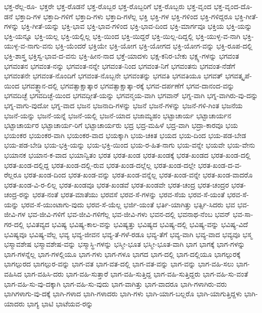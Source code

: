 {ಭಕ್ತ-ರೆಲ್ಲ-ರೂ-
ಭಕ್ತರೇ
ಭಕ್ತ-ರೊಡನೆ
ಭಕ್ತ-ರೊಬ್ಬರ
ಭಕ್ತ-ರೊಬ್ಬರಿಗೆ
ಭಕ್ತ-ರೊಬ್ಬರು
ಭಕ್ತ-ವೃಂದ
ಭಕ್ತ-ವೃಂದ-ದೊ-ಡನೆ
ಭಕ್ತಾದಿ-ಗಳ
ಭಕ್ತಾದಿ-ಗಳಿಗೆ
ಭಕ್ತಾದಿ-ಗಳು
ಭಕ್ತಾದಿ-ಗಳೆಲ್ಲ
ಭಕ್ತಿ
ಭಕ್ತಿ-ಗಳ
ಭಕ್ತಿ-ಗಳಿಂದ
ಭಕ್ತಿ-ಗಳಿದ್ದರೂ
ಭಕ್ತಿ-ಗೀತೆ-ಗಳನ್ನು
ಭಕ್ತಿ-ಗೀತೆ-ಯನ್ನು
ಭಕ್ತಿ-ಭಾವ
ಭಕ್ತಿ-ಭಾವ-ಗಳಿಂದ
ಭಕ್ತಿ-ಭಾವ-ದಿಂದ
ಭಕ್ತಿ-ಮಾರ್ಗವೂ
ಭಕ್ತಿಯ
ಭಕ್ತಿ-ಯನ್ನು
ಭಕ್ತಿ-ಯನ್ನೂ
ಭಕ್ತಿ-ಯಲ್ಲ
ಭಕ್ತಿ-ಯಲ್ಲಿಲ್ಲ
ಭಕ್ತಿ-ಯಿಂದ
ಭಕ್ತಿ-ಯಿದ್ದರೆ
ಭಕ್ತಿ-ಯಿಲ್ಲ-ದಿದ್ದಲ್ಲಿ
ಭಕ್ತಿ-ಯುಳ್ಳ-ವ-ನಾಗಿ
ಭಕ್ತಿ-ಯುಳ್ಳ-ವ-ನಾಗು-ವನು
ಭಕ್ತಿ-ಯೆಂದರೆ
ಭಕ್ತಿಯೇ
ಭಕ್ತಿ-ಯೋಗ
ಭಕ್ತಿ-ಯೋಗದ
ಭಕ್ತಿ-ಯೋಗ-ವನ್ನು
ಭಕ್ತಿ-ರೂಪ-ದಲ್ಲಿ
ಭಕ್ತಿ-ಶಾಸ್ತ್ರ
ಭಕ್ತಿಸ್ವ-ಭಾವ-ದ-ವನು
ಭಕ್ತಿ-ಹೀನ-ನಾದ
ಭಕ್ತೆ-ಯಾದಳು
ಭಕ್ಷ-ಕನಿರ-ಬೇಕು
ಭಕ್ಷ್ಯ-ಗಳನ್ನು
ಭಗವಂತ
ಭಗವಂತನ
ಭಗವಂತ-ನನ್ನು
ಭಗವಂತ-ನನ್ನೇ
ಭಗವಂತ-ನಿಂದ
ಭಗವಂತ-ನಿಗೆ
ಭಗವಂತನು
ಭಗವಂತ-ನೆಡೆಗೆ
ಭಗವಂತನೇ
ಭಗವಂತ-ನೊಂದಿಗೆ
ಭಗವಂತ-ನೊಬ್ಬನೇ
ಭಗವಂತನ್ನು
ಭಗವತಿ
ಭಗವತಿಯೂ
ಭಗವತ್
ಭಗವತ್ಕೃಪೆ-ಯಿಂದ
ಭಗವತ್ಧ್ಯಾನ-ದಲ್ಲಿ
ಭಗವತ್ಸಾಕ್ಷಾತ್ಕಾರ
ಭಗವತ್ಸಾಕ್ಷಾತ್ಕಾ-ರಕ್ಕೆ
ಭಗವ-ದರ್ಪಣೆಗೆ
ಭಗವ-ದಾನಂದ-ವನ್ನು
ಭಗವದಿಚ್ಛೆ
ಭಗವದಿಚ್ಛೆ-ಯಿಂದ
ಭಗವದ್ಗೀತೆ-ಯನ್ನು
ಭಗವನ್ಮಯ-ವಾಗಿ
ಭಗವಾನ್
ಭಗ್ನ-ವಾಗಿ
ಭಗ್ನ-ವಾಗಿರು-ವು-ದನ್ನು
ಭಗ್ನ-ವಾಗು-ವುದೋ
ಭಗ್ನ-ವಾದ
ಭಜನ
ಭಜನಾದಿ-ಗಳನ್ನು
ಭಜನೆ
ಭಜನೆ-ಗಳನ್ನು
ಭಜನೆ-ಗಳಿ-ಗಿಂತ
ಭಜನೆಯ
ಭಜನೆ-ಯನ್ನು
ಭಜನೆ-ಯನ್ನೆ
ಭಜನೆ-ಯಲ್ಲಿ
ಭಜನೆ-ಯಾದ
ಭಜಾಮ್ಯಹಂ
ಭಟ್ಟಾಚಾರ್ಯ
ಭಟ್ಟಾಚಾರ್ಯನ
ಭಟ್ಟಾಚಾರ್ಯರ
ಭಟ್ಟಾಚಾರ್ಯ-ರಿಗೆ
ಭಟ್ಟಾಚಾರ್ಯರು
ಭದ್ರ
ಭದ್ರ-ಮಹಿಳೆ
ಭದ್ರ-ವಾಗಿ
ಭದ್ರಾ-ಕಾರವೂ
ಭಯ
ಭಯಂಕರ
ಭಯಂಕರ-ವಾಗಿ
ಭಯಂಕರ-ವಾದ
ಭಯಕ್ಕಾಗಿ
ಭಯ-ಚಕಿತ
ಭಯದ
ಭಯ-ದಿಂದ
ಭಯ-ಪಡ-ಬೇಡ
ಭಯ-ಪಡ-ಬೇಡಿ
ಭಯ-ಭಕ್ತಿ-ಯನ್ನು
ಭಯ-ಭಕ್ತಿ-ಯಿಂದ
ಭಯ-ರ-ಹಿತ-ನಾಗು
ಭಯ-ವನ್ನೇ
ಭಯವೇ
ಭಯ-ವೇನು
ಭಯಾನಕ
ಭಯಾನ-ಕ-ವಾದ
ಭಯಾನ್ವಿತಂ
ಭರತ
ಭರತ-ಖಂಡ
ಭರತ-ಖಂಡಕ್ಕೆ
ಭರತ-ಖಂಡದ
ಭರತ-ಖಂಡ-ದಲ್ಲಿ
ಭರತ-ಖಂಡ-ದಲ್ಲಿದ್ದ
ಭರತ-ಖಂಡ-ದಲ್ಲಿ-ರುವ
ಭರತ-ಖಂಡ-ದಲ್ಲೆಲ್ಲ
ಭರತ-ಖಂಡ-ದಲ್ಲೇ
ಭರತ-ಖಂಡ-ದ-ವ-ರೆಲ್ಲರೂ
ಭರತ-ಖಂಡ-ದಿಂದ
ಭರತ-ಖಂಡ-ವನ್ನು
ಭರತ-ಖಂಡ-ವನ್ನೆಲ್ಲ
ಭರತ-ಖಂಡ-ವನ್ನೇ
ಭರತ-ಖಂಡ-ವಾದರೊ
ಭರತ-ಖಂಡ-ವಿ-ರ-ಲಿಲ್ಲ
ಭರತ-ಖಂಡವೂ
ಭರತ-ಖಂಡವೆ
ಭರತ-ಖಂಡವೇ
ಭರತ-ಚಂದ್ರ
ಭರತ-ಚಂದ್ರರ
ಭರತ-ಚಂದ್ರ-ರನ್ನು
ಭರತ-ನಂತೆ
ಭರತ-ಮಾತೆಯು
ಭರವಸೆ
ಭರವ-ಸೆ-ಗಳನ್ನು
ಭರವ-ಸೆಯ
ಭರವ-ಸೆ-ಯಂತೆ
ಭರವ-ಸೆ-ಯನ್ನು
ಭರವ-ಸೆ-ಯುಂಟಾಗು-ವುದು
ಭರವ-ಸೆ-ಯೆಲ್ಲ
ಭರ್ಜಿ-ಯಂತೆ
ಭರ್ತಿ-ಯಾಗಿತ್ತು
ಭರ್ತ್ಸಿ-ಸಿದರು
ಭವ
ಭವ-ಜೀವಿ-ಗಳ
ಭವ-ಜೀವಿ-ಗಳಿಗೆ
ಭವ-ಜೀವಿ-ಗಳಿಗೆಲ್ಲ
ಭವ-ಜೀವಿ-ಗಳು
ಭವನ-ದಲ್ಲಿ
ಭವನಾಥ-ನೆಂಬ
ಭವನ್
ಭವ-ಸಾ-ಗರ-ದಲ್ಲಿ
ಭವಿತವ್ಯದ
ಭವಿಷ್ಯ
ಭವಿಷ್ಯ-ಕಾಲ-ವನ್ನು
ಭವಿಷ್ಯತ್ತು
ಭವಿಷ್ಯದ
ಭವಿಷ್ಯ-ದಲ್ಲಿ
ಭವಿಷ್ಯ-ವನ್ನು
ಭವಿಷ್ಯ-ವಿದೆ
ಭವಿಷ್ಯವೂ
ಭವಿಷ್ಯ-ವೆಲ್ಲ
ಭವ್ಯ
ಭವ್ಯ-ಜೀವನ
ಭವ್ಯ-ತೆ-ಗಳೆ-ರಡೂ
ಭವ್ಯ-ತೆಗೆ
ಭವ್ಯ-ವಾಗಿ
ಭವ್ಯ-ವಾದ
ಭವ್ಯವೂ
ಭಸ್ಮ
ಭಸ್ಮಾವಶೇಷ
ಭಸ್ಮಾವಶೇಷ-ವನ್ನು
ಭಸ್ಮಾಸ್ಥಿ-ಗಳನ್ನು
ಭಸ್ಮೀ-ಭೂತ
ಭಸ್ಮೀ-ಭೂತ-ವಾಗಿ
ಭಾಗ
ಭಾಗಕ್ಕೆ
ಭಾಗ-ಗಳನ್ನು
ಭಾಗ-ಗಳನ್ನೆಲ್ಲ
ಭಾಗ-ಗಳಲ್ಲಿಯೂ
ಭಾಗ-ಗಳು
ಭಾಗ-ಗಳೂ
ಭಾಗದ
ಭಾಗ-ದಲ್ಲಿ
ಭಾಗ-ದಲ್ಲಿಯೂ
ಭಾಗಲ್ಪುರಕ್ಕೆ
ಭಾಗಲ್ಪುರದ
ಭಾಗಲ್ಪುರ-ವನ್ನು
ಭಾಗ-ವತ
ಭಾಗ-ವತ-ದಲ್ಲಿ
ಭಾಗ-ವತ-ವನ್ನು
ಭಾಗ-ವನ್ನು
ಭಾಗ-ವಹಿ-ಸಲು
ಭಾಗ-ವಹಿಸಿದ
ಭಾಗ-ವಹಿಸಿ-ದರು
ಭಾಗ-ವಹಿ-ಸುತ್ತಾರೆ
ಭಾಗ-ವಹಿ-ಸುತ್ತಿದ್ದ
ಭಾಗ-ವಹಿ-ಸುತ್ತಿದ್ದರು
ಭಾಗ-ವಹಿ-ಸು-ವಂತೆ
ಭಾಗ-ವಹಿ-ಸು-ವು-ದಕ್ಕಾಗಿ
ಭಾಗ-ವಹಿ-ಸು-ವುದು
ಭಾಗ-ವಾಗಿತ್ತು
ಭಾಗ-ವಾದರೂ
ಭಾಗಿ-ಗಳಾಗಿರು-ವರು
ಭಾಗಿಗಳಾಗು-ವು-ದಕ್ಕೆ
ಭಾಗಿ-ಗಳಾದ
ಭಾಗಿ-ಗಳಾದರು
ಭಾಗಿ-ಗಳು
ಭಾಗಿ-ಯಾಗ-ಬಲ್ಲರೊ
ಭಾಗಿ-ಯಾಗುತ್ತಿದ್ದಳು
ಭಾಗಿ-ಯಾದರು
ಭಾಗ್ಯ
ಭಾಟಿ
ಭಾಟೆಯವ-ರನ್ನು
}
